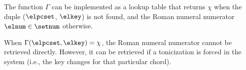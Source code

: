 The function $\Gamma$ can be implemented as a lookup table
that returns $\chi$ when the duple ($\elpcset$, $\elkey$) is
not found, and the Roman numeral numerator $\elnum \in
\setnum$ otherwise.

When $\Gamma(\elpcset, \elkey) = \chi$, the Roman numeral
numerator cannot be retrieved directly. However, it can be
retrieved if a tonicization is forced in the system (i.e.,
the key changes for that particular chord).

